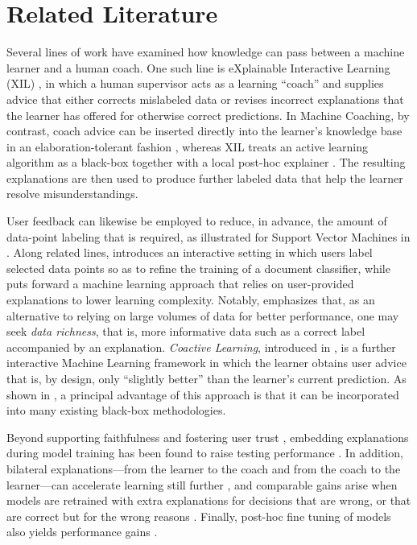 \documentclass[a4paper,twoside]{article}
\begin{document}
\section{Related Literature}\label{sec:related-literature}
%
Several lines of work have examined how knowledge can pass between a machine learner and a human coach. One such line is eXplainable Interactive Learning (XIL) \cite{tesoKerstingIML2019}, in which a human supervisor acts as a learning ``coach'' and supplies advice that either corrects mislabeled data or revises incorrect explanations that the learner has offered for otherwise correct predictions. In Machine Coaching, by contrast, coach advice can be inserted directly into the learner's knowledge base in an elaboration-tolerant fashion \cite{mccarthyElaborationTolerance1998}, whereas XIL treats an active learning algorithm as a black-box \cite{Settles2009ActiveLL} together with a local post-hoc explainer \cite{ribeiro2016}. The resulting explanations are then used to produce further labeled data that help the learner resolve misunderstandings.

User feedback can likewise be employed to reduce, in advance, the amount of data-point labeling that is required, as illustrated for Support Vector Machines in \cite{raghavanAllan2007}. Along related lines, \cite{settles-2011-closing} introduces an interactive setting in which users label selected data points so as to refine the training of a document classifier, while \cite{zaidan2007using} puts forward a machine learning approach that relies on user-provided explanations to lower learning complexity. Notably, \cite{zaidan2007using} emphasizes that, as an alternative to relying on large volumes of data for better performance, one may seek \emph{data richness}, that is, more informative data such as a correct label accompanied by an explanation. \emph{Coactive Learning}, introduced in \cite{shivaswamyJoachims2015}, is a further interactive Machine Learning framework in which the learner obtains user advice that is, by design, only ``slightly better'' than the learner's current prediction. As shown in \cite{shivaswamyJoachims2015}, a principal advantage of this approach is that it can be incorporated into many existing black-box methodologies.

Beyond supporting faithfulness and fostering user trust \cite{BARREDOARRIETA202082}, embedding explanations during model training has been found to raise testing performance \cite{Selvaraju_2019}. In addition, bilateral explanations---from the learner to the coach and from the coach to the learner---can accelerate learning still further \cite{dongSu2017}, and comparable gains arise when models are retrained with extra explanations for decisions that are wrong, or that are correct but for the wrong reasons \cite{riegerSingh2019}. Finally, post-hoc fine tuning of models also yields performance gains \cite{ribeiro2016}.
\end{document}
